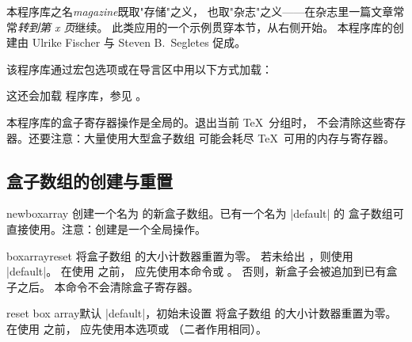 本程序库之名\emph{magazine}既取"存储"之义，
也取"杂志"之义——在杂志里一篇文章常常\emph{转到第 x 页}继续。
此类应用的一个示例贯穿本节，从右侧开始。
本程序库的创建由 Ulrike Fischer 与 Steven B.~Segletes 促成。

该程序库通过宏包选项或在导言区中用以下方式加载：
\begin{dispListing}
\end{dispListing}
这还会加载  程序库，参见 。

\begin{marker}
本程序库的盒子寄存器操作是全局的。退出当前 \TeX\ 分组时，
不会清除这些寄存器。还要注意：大量使用大型盒子数组
可能会耗尽 \TeX\ 可用的内存与寄存器。
\end{marker}

\subsection{盒子数组的创建与重置}\label{subsec:magazine_creation}

\begin{docCommand}[doc new=2015-07-13]{newboxarray}{}
  创建一个名为  的新盒子数组。已有一个名为 |default| 的
  盒子数组可直接使用。注意：创建是一个全局操作。
\begin{dispListing}
\end{dispListing}
\end{docCommand}


\begin{docCommand}[doc new=2015-07-13]{boxarrayreset}{}
  将盒子数组  的大小计数器重置为零。
  若未给出 ，则使用 |default|。
  在使用  之前，
  应先使用本命令或 。
  否则，新盒子会被追加到已有盒子之后。
  本命令不会清除盒子寄存器。
\begin{dispListing}
\boxarrayreset            %
\end{dispListing}
\end{docCommand}

\enlargethispage*{20mm}

\begin{docTcbKey}[][doc new=2015-07-13]{reset box array}{}{默认 |default|，初始未设置}
  将盒子数组  的大小计数器重置为零。
  在使用  之前，
  应先使用本选项或 （二者作用相同）。
\begin{dispListing}
\end{dispListing}
\end{docTcbKey}

